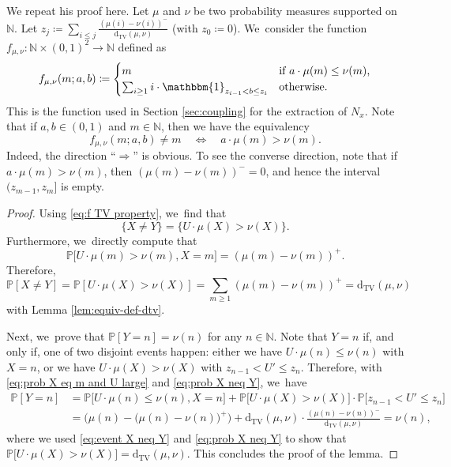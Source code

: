 \documentclass[10pt,a4paper]{article}
\newcommand{\NN}{\mathbb{N}}
\newcommand{\PP}{\mathbb{P}}
\newcommand{\one}{\mathbbm{1}}
\newcommand{\dtv}{\mathrm{d}_{\mathrm{TV}}}
\newcommand{\bg}{\big}
\newcommand{\bgg}{\Big}
\theoremstyle{plain}
\theoremstyle{definition}
\begin{document}
We repeat his proof here. Let $\mu$ and $\nu$ be two probability measures supported on $\NN$. Let $z_j \coloneqq \sum_{i \le j} \frac{(\mu(i) - \nu(i))^-}{\dtv(\mu, \nu)}$ (with $z_0 \coloneqq 0$). We~consider the function $f_{\mu, \nu}\colon \NN \times (0, 1)^2 \to \NN$ defined as
\[
f_{\mu, \nu}(m; a, b) \coloneqq \begin{cases}
m &\text{if $a \cdot \mu(m) \le \nu(m)$,} \\
\sum_{i \ge 1} i \cdot \one_{z_{i-1} < b \le z_i} &\text{otherwise.}
\end{cases}
\]
This is the function used in Section \ref{sec:coupling} for the extraction of $N_x$.
Note that if $a,b\in(0,1)$ and $m\in\NN$, then we have the equivalency
\begin{equation}
\label{eq:f TV property}
f_{\mu, \nu}(m; a, b) \ne m\quad\iff\quad a\cdot \mu(m) > \nu(m).
\end{equation}
Indeed, the direction ``$\Rightarrow$'' is obvious. To see the converse direction, note that if \hbox{$a\cdot\mu(m)>\nu(m)$}, then $(\mu(m)-\nu(m))^-=0$, and hence the interval $(z_{m-1},z_m]$ is empty.

\begin{proof}
Using \eqref{eq:f TV property}, we~find that
\begin{equation}
\label{eq:event X neq Y}
\{X \ne Y\}=\{U \cdot \mu(X) > \nu(X)\}.
\end{equation}
Furthermore, we~directly compute that
\begin{equation}
\label{eq:prob X eq m and U large}
\PP\bg[U\cdot \mu(m)> \nu(m), X = m\bg] = (\mu(m) - \nu(m))^+.
\end{equation}
Therefore,
\begin{equation}
\label{eq:prob X neq Y}
\PP[X \ne Y] = \PP[U \cdot \mu(X) > \nu(X)] = \sum_{m \ge 1} (\mu(m) - \nu(m))^+ = \dtv(\mu, \nu)
\end{equation}
with Lemma \ref{lem:equiv-def-dtv}.

Next, we~prove that $\PP[Y = n] = \nu(n)$ for any $n \in \NN$. Note that $Y = n$ if, and only if, one of two disjoint events happen: either we have $U \cdot \mu(n)\le \nu(n)$ with $X = n$, or we have $U\cdot \mu(X) > \nu(X)$ with $z_{n-1} < U' \le z_n$. Therefore, with \eqref{eq:prob X eq m and U large} and \eqref{eq:prob X neq Y}, we~have
\begin{align*}
\PP[Y = n]
&= \PP\bg[U \cdot \mu(n)\le \nu(n), X = n\bg] + \PP\bg[U\cdot \mu(X) > \nu(X)\bg] \cdot \PP\bg[z_{n-1} < U' \le z_n\bg] \\
&= \bgg(\mu(n) - \bg(\mu(n) - \nu(n)\bg)^+\bgg) + \dtv(\mu, \nu) \cdot \frac{(\mu(n) - \nu(n))^-}{\dtv(\mu, \nu)} = \nu(n),
\end{align*}
where we used \eqref{eq:event X neq Y} and \eqref{eq:prob X neq Y} to show that $\PP\bg[U\cdot \mu(X) > \nu(X)\bg]=\dtv(\mu,\nu)$.
This concludes the proof of the lemma.
\end{proof}
\end{document}
